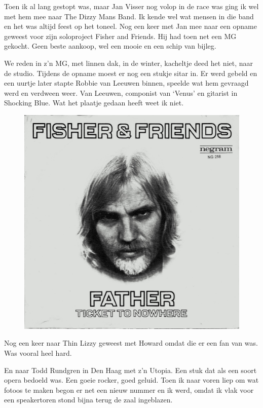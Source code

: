 \documentclass[12pt,twoside, openright]{memoir}
\begin{document}
Toen ik al lang gestopt was, maar Jan Visser nog volop in de race was ging ik wel met hem mee naar The Dizzy Mans Band. Ik kende wel wat mensen in die band en het was altijd feest op het toneel. Nog een keer met Jan mee naar een opname geweest voor zijn soloproject Fisher and Friends. Hij had toen net een MG gekocht. Geen beste aankoop, wel een mooie en een schip van bijleg. 

We reden in z’n MG, met linnen dak, in de winter, kacheltje deed het niet, naar de studio. Tijdens de opname moest er nog een stukje sitar in. Er werd gebeld en een uurtje later stapte Robbie van Leeuwen binnen, speelde wat hem gevraagd werd en verdween weer. Van Leeuwen, componist van ‘Venus’ en gitarist in Shocking Blue. Wat het plaatje gedaan heeft weet ik niet.

\begin{figure}
\includegraphics[width=\textwidth]{img/ch31/ff}
\end{figure}

Nog een keer naar Thin Lizzy geweest met Howard omdat die er een fan van was. Was vooral heel hard. 

En naar Todd Rundgren in Den Haag met z’n Utopia. Een stuk dat als een soort opera bedoeld was. Een goeie rocker, goed geluid. Toen ik naar voren liep om wat fotoos te maken begon er net een nieuw nummer en ik werd, omdat ik vlak voor een speakertoren stond bijna terug de zaal ingeblazen.
\end{document}
